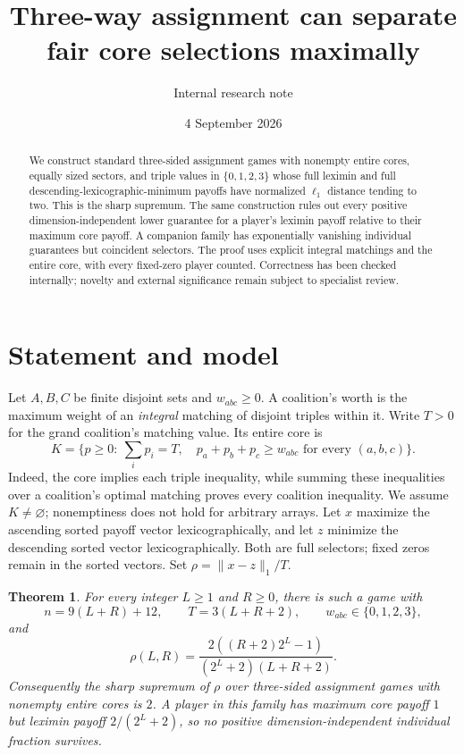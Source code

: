 \documentclass[11pt]{article}
\title{Three-way assignment can separate fair core selections maximally}
\author{Internal research note}
\date{4 September 2026}
\newtheorem{theorem}{Theorem}
\begin{document}
\maketitle
\begin{abstract}
We construct standard three-sided assignment games with nonempty entire cores,
equally sized sectors, and triple values in $\{0,1,2,3\}$ whose full leximin and
full descending-lexicographic-minimum payoffs have normalized $\ell_1$ distance
tending to two. This is the sharp supremum. The same construction rules out
every positive dimension-independent lower guarantee for a player's leximin
payoff relative to their maximum core payoff. A companion family has
exponentially vanishing individual guarantees but coincident selectors.
The proof uses explicit integral matchings and the entire core, with every
fixed-zero player counted. Correctness has been checked internally;
novelty and external significance remain subject to specialist review.
\end{abstract}

\section{Statement and model}
Let $A,B,C$ be finite disjoint sets and $w_{abc}\ge0$. A coalition's worth is
the maximum weight of an \emph{integral} matching of disjoint triples within
it. Write $T>0$ for the grand coalition's matching value. Its entire core is
\[
 K=\{p\ge0:\ \sum_i p_i=T,\quad p_a+p_b+p_c\ge w_{abc}
       \text{ for every }(a,b,c)\}.
\]
Indeed, the core implies each triple inequality, while summing these inequalities
over a coalition's optimal matching proves every coalition inequality.
We assume $K\ne\varnothing$; nonemptiness does not hold for arbitrary arrays.
Let $x$ maximize the ascending sorted payoff vector lexicographically, and let
$z$ minimize the descending sorted vector lexicographically. Both are full
selectors; fixed zeros remain in the sorted vectors. Set
$\rho=\|x-z\|_1/T$.

\begin{theorem}\label{thm:main}
For every integer $L\ge1$ and $R\ge0$, there is such a game with
\[
 n=9(L+R)+12,\qquad T=3(L+R+2),\qquad w_{abc}\in\{0,1,2,3\},
\]
and
\begin{equation}\label{eq:rho}
 \rho(L,R)=\frac{2((R+2)2^L-1)}{(2^L+2)(L+R+2)}.
\end{equation}
Consequently the sharp supremum of $\rho$ over three-sided assignment games
with nonempty entire cores is $2$. A player in this family has maximum core
payoff $1$ but leximin payoff $2/(2^L+2)$, so no positive dimension-independent
individual fraction survives.
\end{theorem}
\end{document}
